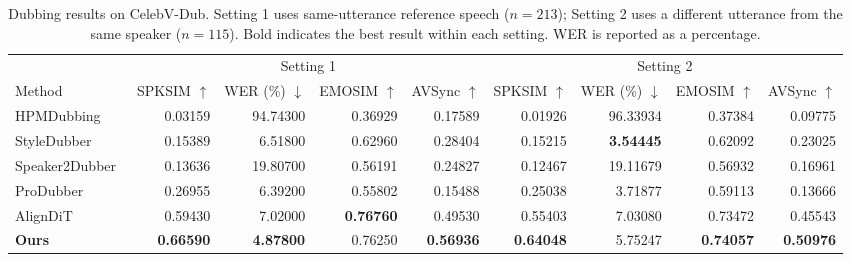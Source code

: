 \begin{table}[!t]
\centering
\caption{Dubbing results on CelebV-Dub. Setting 1 uses same-utterance reference speech ($n=213$); Setting 2 uses a different utterance from the same speaker ($n=115$). Bold indicates the best result within each setting. WER is reported as a percentage.}
\label{tab:celebvdub}
\footnotesize
\setlength{\tabcolsep}{4pt}
\begin{tabular}{@{}lrrrrrrrr@{}}
\toprule
 & \multicolumn{4}{c}{Setting 1} & \multicolumn{4}{c}{Setting 2} \\
\cmidrule(lr){2-5}\cmidrule(l){6-9}
Method & SPKSIM $\uparrow$ & WER (\%) $\downarrow$ & EMOSIM $\uparrow$ & AVSync $\uparrow$ & SPKSIM $\uparrow$ & WER (\%) $\downarrow$ & EMOSIM $\uparrow$ & AVSync $\uparrow$ \\
\midrule
HPMDubbing~\cite{cong2023hpmdubbing} & 0.03159 & 94.74300 & 0.36929 & 0.17589 & 0.01926 & 96.33934 & 0.37384 & 0.09775 \\
StyleDubber~\cite{cong2024styledubber} & 0.15389 & 6.51800 & 0.62960 & 0.28404 & 0.15215 & \textbf{3.54445} & 0.62092 & 0.23025 \\
Speaker2Dubber~\cite{zhang2024speaker2dubber} & 0.13636 & 19.80700 & 0.56191 & 0.24827 & 0.12467 & 19.11679 & 0.56932 & 0.16961 \\
ProDubber~\cite{zhang2025produbber} & 0.26955 & 6.39200 & 0.55802 & 0.15488 & 0.25038 & 3.71877 & 0.59113 & 0.13666 \\
AlignDiT~\cite{choi2025aligndit} & 0.59430 & 7.02000 & \textbf{0.76760} & 0.49530 & 0.55403 & 7.03080 & 0.73472 & 0.45543 \\
\midrule
\textbf{Ours} & \textbf{0.66590} & \textbf{4.87800} & 0.76250 & \textbf{0.56936} & \textbf{0.64048} & 5.75247 & \textbf{0.74057} & \textbf{0.50976} \\
\bottomrule
\end{tabular}
\end{table}
